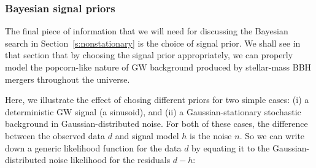 \subsubsection{Bayesian signal priors}
\label{s:signal_priors}

The final piece of information that we will need 
for discussing the Bayesian search in 
Section~\ref{s:nonstationary} is the choice 
of signal prior.
We shall see in that section that by choosing the 
signal prior appropriately, we can properly model 
the popcorn-like nature of GW background produced by
stellar-mass BBH mergers throughout the universe.

Here, we illustrate the effect of chosing different
priors for two simple cases: 
(i) a deterministic GW signal (a sinusoid), and 
(ii) a Gaussian-stationary stochastic background in 
Gaussian-distributed noise.
For both of these cases, the difference between the 
observed data $d$ and signal model $h$ is the noise $n$.
So we can write down a generic likelihood function for 
the data $d$ by equating it to the 
Gaussian-distributed noise likelihood for the residuals $d-h$:
%
